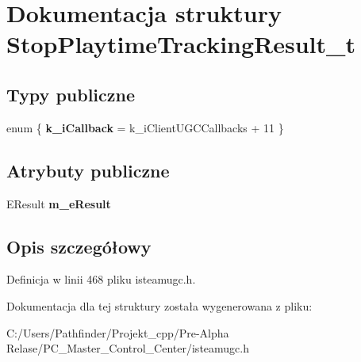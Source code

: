 \hypertarget{struct_stop_playtime_tracking_result__t}{}\section{Dokumentacja struktury Stop\+Playtime\+Tracking\+Result\+\_\+t}
\label{struct_stop_playtime_tracking_result__t}
\subsection*{Typy publiczne}
\begin{DoxyCompactItemize}
\item 
\mbox{\label{struct_stop_playtime_tracking_result__t_ab0d3fb140ebd0b910302e7596ce94028}} 
enum \{ {\bfseries k\+\_\+i\+Callback} = k\+\_\+i\+Client\+U\+G\+C\+Callbacks + 11
 \}
\end{DoxyCompactItemize}
\subsection*{Atrybuty publiczne}
\begin{DoxyCompactItemize}
\item 
\mbox{\label{struct_stop_playtime_tracking_result__t_a81e0ffa2b550f7c2b9d7ab0a65760cbf}} 
E\+Result {\bfseries m\+\_\+e\+Result}
\end{DoxyCompactItemize}


\subsection{Opis szczegółowy}


Definicja w linii 468 pliku isteamugc.\+h.



Dokumentacja dla tej struktury została wygenerowana z pliku\+:\begin{DoxyCompactItemize}
\item 
C\+:/\+Users/\+Pathfinder/\+Projekt\+\_\+cpp/\+Pre-\/\+Alpha Relase/\+P\+C\+\_\+\+Master\+\_\+\+Control\+\_\+\+Center/isteamugc.\+h\end{DoxyCompactItemize}
